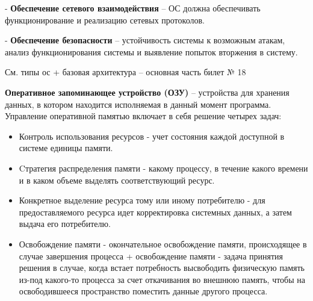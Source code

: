 - \textbf{Обеспечение сетевого взаимодействия} -- ОС должна обеспечивать функционирование и реализацию сетевых протоколов.

- \textbf{Обеспечение безопасности} -- устойчивость системы к возможным атакам, анализ функционирования системы и выявление попыток вторжения в систему. 


См. типы ос + базовая архитектура -- основная часть билет № 18

\textbf{Оперативное запоминающее устройство (ОЗУ)} -- устройства для хранения данных, в котором находится исполняемая в данный момент программа. Управление оперативной памятью включает в себя решение четырех задач: 
\begin{itemize}
    \item Контроль использования ресурсов - учет состояния каждой доступной в системе единицы памяти.
    \item Cтратегия распределения памяти - какому процессу, в течение какого времени и в каком объеме выделять соответствующий ресурс.
    \item Конкретное выделение ресурса тому или иному потребителю - для предоставляемого ресурса идет корректировка системных данных, а затем выдача его потребителю. 
    \item Освобождение памяти - окончательное освобождение памяти, происходящее в случае завершения процесса + освобождение памяти - задача принятия решения в случае, когда встает потребность высвободить физическую память из-под какого-то процесса за счет откачивания во внешнюю память, чтобы на освободившееся пространство поместить данные другого процесса. 
\end{itemize}  

